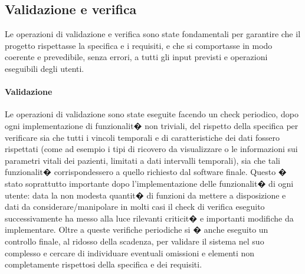 \documentclass[final, smallexted]{svjour3}
\begin{document}
\subsection{Validazione e verifica}
Le operazioni di validazione e verifica sono state fondamentali per garantire che il progetto rispettasse la specifica e i requisiti, e che si comportasse in modo coerente e prevedibile, senza errori, a tutti gli input previsti e operazioni eseguibili degli utenti.

\paragraph{\textbf{Validazione}}Le operazioni di validazione sono state eseguite facendo un check periodico, dopo ogni implementazione di funzionalit� non triviali, del rispetto della specifica per verificare sia che tutti i vincoli temporali e di caratteristiche dei dati fossero rispettati (come ad esempio i tipi di ricovero da visualizzare o le informazioni sui parametri vitali dei pazienti, limitati a dati intervalli temporali), sia che tali funzionalit� corrispondessero a quello richiesto dal software finale.
Questo � stato soprattutto importante dopo l'implementazione delle funzionalit� di ogni utente: data la non modesta quantit� di funzioni da mettere a disposizione e dati da considerare/manipolare in molti casi il check di verifica eseguito successivamente ha messo alla luce rilevanti criticit� e importanti modifiche da implementare. 
Oltre a queste verifiche periodiche si � anche eseguito un controllo finale, al ridosso della scadenza, per validare il sistema nel suo complesso e cercare di individuare eventuali omissioni e elementi non completamente rispettosi della specifica e dei requisiti.
\end{document}
